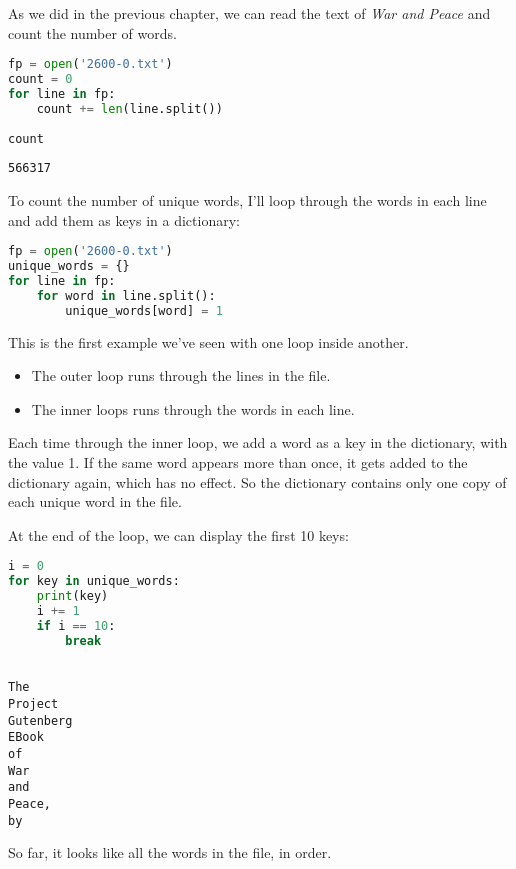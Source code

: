 As we did in the previous chapter, we can read the text of \emph{War and
Peace} and count the number of words.

\begin{lstlisting}[language=Python,style=source]
fp = open('2600-0.txt')
count = 0
for line in fp:
    count += len(line.split())
    
count
\end{lstlisting}

\begin{lstlisting}[style=output]
566317
\end{lstlisting}

To count the number of unique words, I'll loop through the words in each
line and add them as keys in a dictionary:

\begin{lstlisting}[language=Python,style=source]
fp = open('2600-0.txt')
unique_words = {}
for line in fp:
    for word in line.split():
        unique_words[word] = 1
\end{lstlisting}

This is the first example we've seen with one loop inside another.

\begin{itemize}
\item
  The outer loop runs through the lines in the file.
\item
  The inner loops runs through the words in each line.
\end{itemize}

Each time through the inner loop, we add a word as a key in the
dictionary, with the value 1. If the same word appears more than once,
it gets added to the dictionary again, which has no effect. So the
dictionary contains only one copy of each unique word in the file.

At the end of the loop, we can display the first 10 keys:

\begin{lstlisting}[language=Python,style=source]
i = 0
for key in unique_words:
    print(key)
    i += 1
    if i == 10:
        break
\end{lstlisting}

\begin{lstlisting}[style=output]

The
Project
Gutenberg
EBook
of
War
and
Peace,
by
\end{lstlisting}

So far, it looks like all the words in the file, in order.

